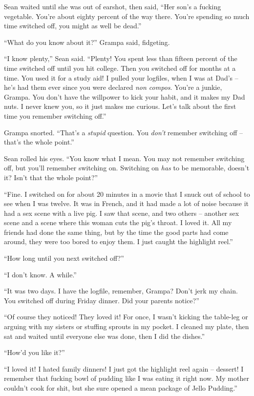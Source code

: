 Sean waited until she was out of earshot, then said, “Her son's a 
fucking vegetable. You're about eighty percent of the way there. You're 
spending so much time switched off, you might as well be dead.”

“What do you know about it?” Grampa said, fidgeting.

“I know plenty,” Sean said. “Plenty! You spent less than fifteen 
percent of the time switched off until you hit college. Then you 
switched off for months at a time. You used it for a study aid! I 
pulled your logfiles, when I was at Dad's -- he's had them ever since 
you were declared \emph{non compos}. You're a junkie, Grampa. You don't 
have the willpower to kick your habit, and it makes my Dad nuts. I 
never knew you, so it just makes me curious. Let's talk about the first 
time you remember switching off.”

Grampa snorted. “That's a \emph{stupid} question. You \emph{don't} 
remember switching off -- that's the whole point.”

Sean rolled his eyes. “You know what I mean. You may not remember 
switching off, but you'll remember switching on. Switching on 
\emph{has} to be memorable, doesn't it? Isn't that the whole point?”

“Fine. I switched on for about 20 minutes in a movie that I snuck out 
of school to see when I was twelve. It was in French, and it had made a 
lot of noise because it had a sex scene with a live pig. I saw that 
scene, and two others -- another sex scene and a scene where this woman 
cuts the pig's throat. I loved it. All my friends had done the same 
thing, but by the time the good parts had come around, they were too 
bored to enjoy them. I just caught the highlight reel.”

“How long until you next switched off?”

“I don't know. A while.”

“It was two days. I have the logfile, remember, Grampa? Don't jerk my 
chain. You switched off during Friday dinner. Did your parents 
notice?”

“Of course they noticed! They loved it! For once, I wasn't kicking 
the table-leg or arguing with my sisters or stuffing sprouts in my 
pocket. I cleaned my plate, then sat and waited until everyone else was 
done, then I did the dishes.”

“How'd you like it?”

“I loved it! I hated family dinners! I just got the highlight reel 
again -- dessert! I remember that fucking bowl of pudding like I was 
eating it right now. My mother couldn't cook for shit, but she sure 
opened a mean package of Jello Pudding.”

